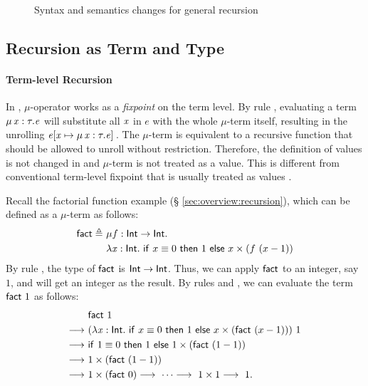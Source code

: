 \begin{figure}
	\gram{\newsyntax}\vspace{1em}
	\ottdefnstepXXrec{}
	\ottdefnexprXXrec{}
	\caption{Syntax and semantics changes for general recursion}
    \label{fig:rec:ext}
\end{figure}

\subsection{Recursion as Term and Type}
\paragraph{Term-level Recursion}

In \name, $ \mu $-operator works as a \emph{fixpoint} on the term
level. By rule , evaluating a term $\mu \, \mathit{x}  :  \tau  .  \mathit{e}$ will
substitute all $\mathit{x}$ in $e$ with the whole $ \mu $-term itself,
resulting in the unrolling $\mathit{e}  [  \mathit{x}  \mapsto  \mu \, \mathit{x}  :  \tau  .  \mathit{e}  ] \,$. The
$ \mu $-term is equivalent to a recursive function that should be
allowed to unroll without restriction. Therefore, the definition of
values is not changed in \name and $ \mu $-term is not treated as a
value. This is different from conventional term-level fixpoint that is
usually treated as values \cite{zombie:popl14}.

Recall the factorial function example (\S
\ref{sec:overview:recursion}), which can be defined as a $ \mu $-term
as follows:
\begin{align*}
    \mathsf{fact}  \triangleq ~  & \mu  f : \mathsf{Int}  \rightarrow  \mathsf{Int} . \\ &\lambda  \mathit{x}  :  \mathsf{Int}  .  ~\mathsf{if}~x  \equiv 0~\mathsf{then}~1~\mathsf{else}~x \times (f~(x
    - 1))
\end{align*}
By rule , the type of $\mathsf{fact}$ is $\mathsf{Int}  \rightarrow  \mathsf{Int}$. Thus, we can apply $\mathsf{fact}$ to an integer, say $1$, and
will get an integer as the result.  By rules  and
, we can evaluate the term $\mathsf{fact}~1$ as follows:
\begin{align*}
    &\mathsf{fact}~1 \\  \longrightarrow ~& (\lambda  \mathit{x}  :  \mathsf{Int}  .  ~\mathsf{if}~x
   \equiv 0~\mathsf{then}~1~\mathsf{else}~x \times (\mathsf{fact}~(x - 1)))~1
  \\  \longrightarrow ~ & \mathsf{if}~1  \equiv 0~\mathsf{then}~1~\mathsf{else}~1 \times
  (\mathsf{fact}~(1 - 1)) \\  \longrightarrow ~& 1 \times (\mathsf{fact}~(1-1))
  \\  \longrightarrow ~& 1 \times (\mathsf{fact}~0)  \longrightarrow ~ \dots  \longrightarrow ~ 1 \times
  1  \longrightarrow ~ 1.
\end{align*}

